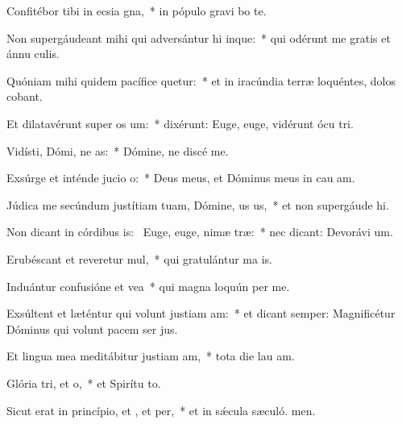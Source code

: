 \item Confitébor tibi in ecsia gna,~* in pópulo gravi bo te.
\item Non supergáudeant mihi qui adversántur hi inque:~* qui odérunt me gratis et ánnu culis.
\item Quóniam mihi quidem pacífice quetur:~* et in iracúndia terræ loquéntes, dolos cobant.
\item Et dilatavérunt super  os um:~* dixérunt: Euge, euge, vidérunt ócu tri.
\item Vidísti, Dómi, ne as:~* Dómine, ne discé  me.
\item Exsúrge et inténde jucio o:~* Deus meus, et Dóminus meus in cau am.
\item Júdica me secúndum justítiam tuam, Dómine, us us,~* et non supergáude hi.
\item Non dicant in córdibus is:~\pscross{} Euge, euge, nimæ træ:~* nec dicant: Devorávi um.
\item Erubéscant et reveretur mul,~* qui gratulántur ma is.
\item Induántur confusióne et vea~* qui magna loquún per me.
\item Exsúltent et læténtur qui volunt justiam am:~* et dicant semper: Magnificétur Dóminus qui volunt pacem ser jus.
\item Et lingua mea meditábitur justiam am,~* tota die lau am.
\item Glória tri, et o,~* et Spirítu to.
\item Sicut erat in princípio, et , et per,~* et in sǽcula sæculó. men.
